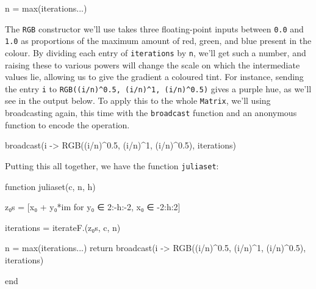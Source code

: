 \documentclass[
  letterpaper,
  DIV=11,
  numbers=noendperiod]{scrreprt}
\newenvironment{Shaded}{\begin{snugshade}}{\end{snugshade}}
\newcommand{\ConstantTok}[1]{\textcolor[rgb]{0.56,0.35,0.01}{#1}}
\newcommand{\ControlFlowTok}[1]{\textcolor[rgb]{0.00,0.23,0.31}{#1}}
\newcommand{\FloatTok}[1]{\textcolor[rgb]{0.68,0.00,0.00}{#1}}
\newcommand{\FunctionTok}[1]{\textcolor[rgb]{0.28,0.35,0.67}{#1}}
\newcommand{\KeywordTok}[1]{\textcolor[rgb]{0.00,0.23,0.31}{#1}}
\newcommand{\NormalTok}[1]{\textcolor[rgb]{0.00,0.23,0.31}{#1}}
\newcommand{\OperatorTok}[1]{\textcolor[rgb]{0.37,0.37,0.37}{#1}}
\begin{document}
\begin{Shaded}
\begin{Highlighting}[]
\NormalTok{n }\OperatorTok{=} \FunctionTok{max}\NormalTok{(iterations}\OperatorTok{...}\NormalTok{)}
\end{Highlighting}
\end{Shaded}

The \texttt{RGB} constructor we'll use takes three floating-point inputs
between \texttt{0.0} and \texttt{1.0} as proportions of the maximum
amount of red, green, and blue present in the colour. By dividing each
entry of \texttt{iterations} by \texttt{n}, we'll get such a number, and
raising these to various powers will change the scale on which the
intermediate values lie, allowing us to give the gradient a coloured
tint. For instance, sending the entry \texttt{i} to
\texttt{RGB((i/n)\^{}0.5,\ (i/n)\^{}1,\ (i/n)\^{}0.5)} gives a purple
hue, as we'll see in the output below. To apply this to the whole
\texttt{Matrix}, we'll using broadcasting again, this time with the
\texttt{broadcast} function and an anonymous function to encode the
operation.

\begin{Shaded}
\begin{Highlighting}[]
\FunctionTok{broadcast}\NormalTok{(i }\OperatorTok{{-}\textgreater{}} \FunctionTok{RGB}\NormalTok{((i}\OperatorTok{/}\NormalTok{n)}\OperatorTok{\^{}}\FloatTok{0.5}\NormalTok{, (i}\OperatorTok{/}\NormalTok{n)}\OperatorTok{\^{}}\FloatTok{1}\NormalTok{, (i}\OperatorTok{/}\NormalTok{n)}\OperatorTok{\^{}}\FloatTok{0.5}\NormalTok{), iterations)}
\end{Highlighting}
\end{Shaded}

Putting this all together, we have the function \texttt{juliaset}:

\begin{Shaded}
\begin{Highlighting}[]
\KeywordTok{function} \FunctionTok{juliaset}\NormalTok{(c, n, h)}

\NormalTok{    z₀s }\OperatorTok{=}\NormalTok{ [x₀ }\OperatorTok{+}\NormalTok{ y₀}\OperatorTok{*}\ConstantTok{im}\NormalTok{ for y₀ }\OperatorTok{∈} \FloatTok{2}\OperatorTok{:{-}}\NormalTok{h}\OperatorTok{:{-}}\FloatTok{2}\NormalTok{, x₀ }\OperatorTok{∈} \OperatorTok{{-}}\FloatTok{2}\OperatorTok{:}\NormalTok{h}\OperatorTok{:}\FloatTok{2}\NormalTok{]}

\NormalTok{    iterations }\OperatorTok{=} \FunctionTok{iterateF}\NormalTok{.(z₀s, c, n)}

\NormalTok{    n }\OperatorTok{=} \FunctionTok{max}\NormalTok{(iterations}\OperatorTok{...}\NormalTok{)}
    \ControlFlowTok{return} \FunctionTok{broadcast}\NormalTok{(i }\OperatorTok{{-}\textgreater{}} \FunctionTok{RGB}\NormalTok{((i}\OperatorTok{/}\NormalTok{n)}\OperatorTok{\^{}}\FloatTok{0.5}\NormalTok{, (i}\OperatorTok{/}\NormalTok{n)}\OperatorTok{\^{}}\FloatTok{1}\NormalTok{, (i}\OperatorTok{/}\NormalTok{n)}\OperatorTok{\^{}}\FloatTok{0.5}\NormalTok{), iterations)}
    
\KeywordTok{end}
\end{Highlighting}
\end{Shaded}
\end{document}
